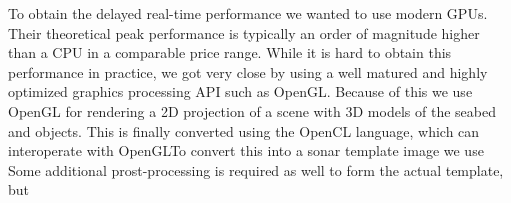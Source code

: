 \documentclass[
   UAM                                          %
 , 12pt                                         %
 , bibtex                                       %
 , layout
]{common/mytemplate}
\begin{document}
To obtain the delayed real-time performance we wanted to use modern GPUs. Their theoretical peak performance is typically an order of magnitude higher than a CPU in a comparable price range. While it is hard to obtain this performance in practice, we got very close by using a well matured and highly optimized graphics processing API such as OpenGL. Because of this we use OpenGL for rendering a 2D projection of a scene with 3D models of the seabed and objects. This is finally converted using the OpenCL language, which can interoperate with OpenGLTo convert this into a sonar template image we use Some additional prost-processing is required as well to form the actual template, but 



% 

% 

% 
% 
\end{document}
